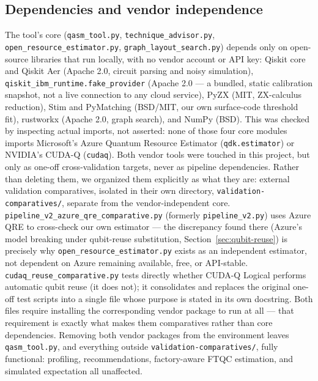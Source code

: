 \documentclass[9pt,twocolumn]{extarticle}
\begin{document}
\subsection{Dependencies and vendor independence}
The tool's core (\texttt{qasm\_tool.py}, \texttt{technique\_advisor.py},
\texttt{open\_resource\_estimator.py}, \texttt{graph\_layout\_search.py})
depends only on open-source libraries that run locally, with no vendor
account or API key: Qiskit core and Qiskit Aer (Apache 2.0, circuit
parsing and noisy simulation), \texttt{qiskit\_ibm\_runtime.fake\_provider}
(Apache 2.0 --- a bundled, static calibration snapshot, not a live
connection to any cloud service), PyZX (MIT, ZX-calculus reduction), Stim
and PyMatching (BSD/MIT, our own surface-code threshold fit), rustworkx
(Apache 2.0, graph search), and NumPy (BSD). This was checked by
inspecting actual imports, not asserted: none of those four core modules
imports Microsoft's Azure Quantum Resource Estimator
(\texttt{qdk.estimator}) or NVIDIA's CUDA-Q (\texttt{cudaq}). Both
vendor tools were touched in this project, but only as one-off
cross-validation targets, never as pipeline dependencies. Rather than
deleting them, we organized them explicitly as what they are: external
validation comparatives, isolated in their own directory,
\texttt{validation-comparatives/}, separate from the vendor-independent
core. \texttt{pipeline\_v2\_azure\_qre\_comparative.py} (formerly
\texttt{pipeline\_v2.py}) uses Azure QRE to cross-check our own
estimator --- the discrepancy found there (Azure's model breaking under
qubit-reuse substitution, Section~\ref{sec:qubit-reuse}) is precisely why
\texttt{open\_resource\_estimator.py} exists as an independent estimator,
not dependent on Azure remaining available, free, or API-stable.
\texttt{cudaq\_reuse\_comparative.py} tests directly whether CUDA-Q
Logical performs automatic qubit reuse (it does not); it consolidates and
replaces the original one-off test scripts into a single file whose
purpose is stated in its own docstring. Both files require installing
the corresponding vendor package to run at all --- that requirement is
exactly what makes them comparatives rather than core dependencies.
Removing both vendor packages from the environment leaves
\texttt{qasm\_tool.py}, and everything outside
\texttt{validation-comparatives/}, fully functional: profiling,
recommendations, factory-aware FTQC estimation, and simulated expectation
all unaffected.
\end{document}
